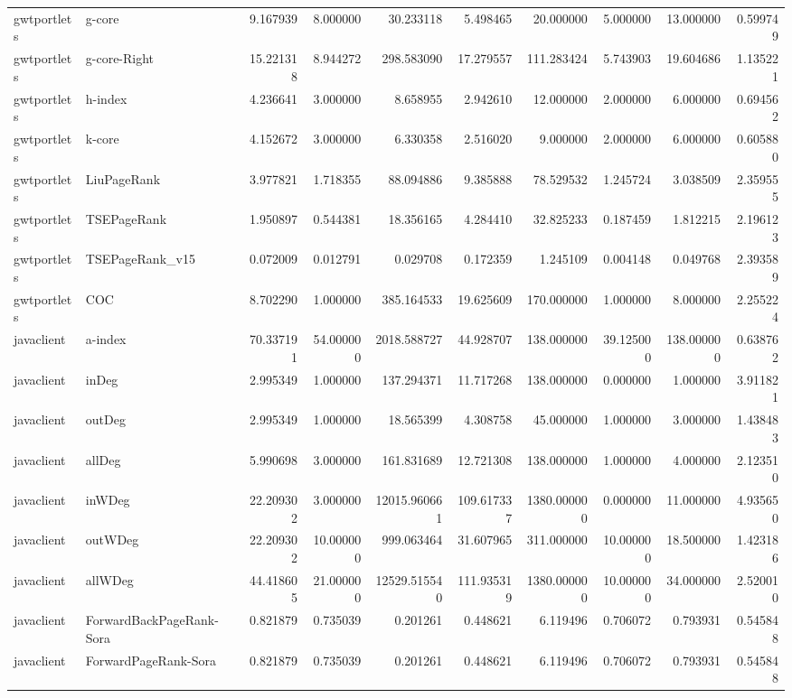 \begin{tabular}{llrrrrrrrr}
gwtportlets & g-core & 9.167939 & 8.000000 & 30.233118 & 5.498465 & 20.000000 & 5.000000 & 13.000000 & 0.599749 \\
gwtportlets & g-core-Right & 15.221318 & 8.944272 & 298.583090 & 17.279557 & 111.283424 & 5.743903 & 19.604686 & 1.135221 \\
gwtportlets & h-index & 4.236641 & 3.000000 & 8.658955 & 2.942610 & 12.000000 & 2.000000 & 6.000000 & 0.694562 \\
gwtportlets & k-core & 4.152672 & 3.000000 & 6.330358 & 2.516020 & 9.000000 & 2.000000 & 6.000000 & 0.605880 \\
gwtportlets & LiuPageRank & 3.977821 & 1.718355 & 88.094886 & 9.385888 & 78.529532 & 1.245724 & 3.038509 & 2.359555 \\
gwtportlets & TSEPageRank & 1.950897 & 0.544381 & 18.356165 & 4.284410 & 32.825233 & 0.187459 & 1.812215 & 2.196123 \\
gwtportlets & TSEPageRank_v15 & 0.072009 & 0.012791 & 0.029708 & 0.172359 & 1.245109 & 0.004148 & 0.049768 & 2.393589 \\
gwtportlets & COC & 8.702290 & 1.000000 & 385.164533 & 19.625609 & 170.000000 & 1.000000 & 8.000000 & 2.255224 \\
javaclient & a-index & 70.337191 & 54.000000 & 2018.588727 & 44.928707 & 138.000000 & 39.125000 & 138.000000 & 0.638762 \\
javaclient & inDeg & 2.995349 & 1.000000 & 137.294371 & 11.717268 & 138.000000 & 0.000000 & 1.000000 & 3.911821 \\
javaclient & outDeg & 2.995349 & 1.000000 & 18.565399 & 4.308758 & 45.000000 & 1.000000 & 3.000000 & 1.438483 \\
javaclient & allDeg & 5.990698 & 3.000000 & 161.831689 & 12.721308 & 138.000000 & 1.000000 & 4.000000 & 2.123510 \\
javaclient & inWDeg & 22.209302 & 3.000000 & 12015.960661 & 109.617337 & 1380.000000 & 0.000000 & 11.000000 & 4.935650 \\
javaclient & outWDeg & 22.209302 & 10.000000 & 999.063464 & 31.607965 & 311.000000 & 10.000000 & 18.500000 & 1.423186 \\
javaclient & allWDeg & 44.418605 & 21.000000 & 12529.515540 & 111.935319 & 1380.000000 & 10.000000 & 34.000000 & 2.520010 \\
javaclient & ForwardBackPageRank-Sora & 0.821879 & 0.735039 & 0.201261 & 0.448621 & 6.119496 & 0.706072 & 0.793931 & 0.545848 \\
javaclient & ForwardPageRank-Sora & 0.821879 & 0.735039 & 0.201261 & 0.448621 & 6.119496 & 0.706072 & 0.793931 & 0.545848 \\

\end{tabular}
